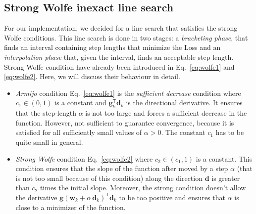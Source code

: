 \documentclass[11pt]{article}
\begin{document}
\subsection{Strong Wolfe inexact line search}
\label{sec:ncg_line_search}

For our implementation, we decided for a line search that satisfies the strong Wolfe conditions. This line search is done in two stages: a \emph{bracketing phase}, that finds an interval containing step lengths that minimize the Loss and an \emph{interpolation phase} that, given the interval, finds an acceptable step length. Strong Wolfe condition have already been introduced in Eq.~\ref{eq:wolfe1} and \ref{eq:wolfe2}. Here, we will discuss their behaviour in detail.
\begin{itemize}
    \item \emph{Armijo} condition Eq.~\ref{eq:wolfe1} is the \emph{sufficient decrease} condition
    where $c_1 \in (0,1)$ is a constant and  $\mathbf{g}_k^\mathsf{T}\mathbf{d}_k$ is the directional derivative. It ensures that the step-length $\alpha$ is not too large and forces a sufficient decrease in the function. However, not sufficient to guarantee convergence, because it is satisfied for all sufficiently small values of $\alpha >0$. The constant $c_1$ has to be quite small in general.  
    
    \item \emph{Strong Wolfe} condition Eq.~\ref{eq:wolfe2}
    where $c_2 \in (c_1,1)$ is a constant. This condition ensures that the slope of the function after moved by a step $\alpha$ (that is not too small because of this condition) along the direction $\mathbf{d}$ is greater than $c_2$ times the initial slope. Moreover, the strong condition doesn't allow the derivative $\mathbf{g}(\mathbf{w}_k + \alpha \, \mathbf{d}_k)^\mathsf{T} \mathbf{d}_k$ to be too positive and ensures that $\alpha$ is close to a minimizer of the function.
\end{itemize}
\end{document}
